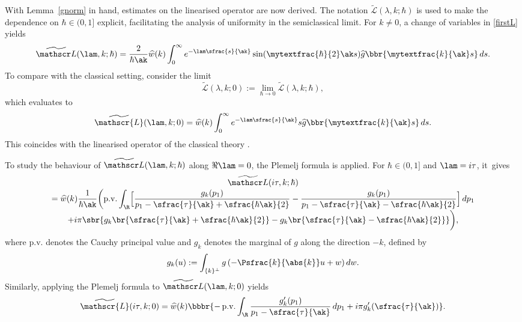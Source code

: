 With Lemma~\ref{gnorm} in hand, estimates on the linearised operator are now derived. The notation \( \widetilde{\mathscr L}(\lambda,k;\hbar) \) is used to make the dependence on \( \hbar \in (0,1] \) explicit, facilitating the analysis of uniformity in the semiclassical limit. For \( k \neq 0 \), a change of variables in \eqref{firstL} yields
\begin{align}
\widetilde {\mathscr L}(\lam,k;\hbar)
= \frac{2}{\hbar\ak} \widehat w(k) \int_0^\infty e^{-\lam \sfrac{s}{\ak}} \sin(\mytextfrac{\hbar}{2} \ak s) \widehat g\bbr{\mytextfrac{k}{\ak}s} \, ds. \label{Lingoodcoordinates}
\end{align}
To compare with the classical setting, consider the limit
\[
\widetilde{\mathscr{L}}(\lambda,k;0) := \lim_{\hbar \to 0} \widetilde{\mathscr{L}}(\lambda,k;\hbar),
\]
which evaluates to\vspace*{-3pt}
\[
\widetilde {\mathscr{L}}(\lam,k;0)
= \widehat w(k) \int_0^\infty e^{-\lam \sfrac{s}{\ak}} s \widehat g\bbr{\mytextfrac{k}{\ak}s} \, ds.
\]
This coincides with the linearised operator of the classical theory
{\cite[Eq.\,(2.6)]{BedrossianMasmoudiMouhot2018}}.

To study the behaviour of \( \widetilde{\mathscr L}(\lam,k;\hbar) \) along $\Re\lam=0$, the Plemelj formula is applied. For $\hbar\in(0,1]$ and \( \lam = i\tau \), it~gives\vspace*{-5pt}
\begin{multline}\label{plemelj}
\widetilde {\mathscr L}(i\tau,k;\hbar)\\[-3pt]
=\widehat w(k)\frac{1}{\hbar\ak}\biggl(\mathrm{p.v.}\int_{\R}\Bigl[\frac{g_k(p_1)}{p_1-\sfrac{\tau}{\ak}+\sfrac{\hbar \ak}{2}}-\frac{g_k(p_1)}{p_1-\sfrac{\tau}{\ak}-\sfrac{\hbar \ak}{2}}\Bigr]\,dp_1\\[-3pt]
+i\pi\sbr{g_k\br{\sfrac{\tau}{\ak}+\sfrac{\hbar \ak}{2}}-g_k\br{\sfrac{\tau}{\ak}-\sfrac{\hbar \ak}{2}}}\biggr),
\end{multline}
where $\mathrm{p.v.}$ denotes the Cauchy principal value and \( g_k \) denotes the marginal of \( g \) along the direction \( -k \), defined by\vspace*{-3pt}
\[
g_k(u) := \int_{\{k\}^\perp} g\left( -\Psfrac{k}{\abs{k}} u + w \right) dw.
\]Similarly, applying the Plemelj formula to \( \widetilde {\mathscr L}(\lam,k;0) \) yields\vspace*{-3pt}
\begin{align*}
\widetilde {\mathscr{L}}(i\tau,k;0)=\widehat w(k)\bbbr{-\,\mathrm{p.v.}\int_{\R}\frac{g_k'(p_1)}{p_1-\sfrac{\tau}{\ak}}\,dp_1+i\pi g_k'(\sfrac{\tau}{\ak})}.
\end{align*}

